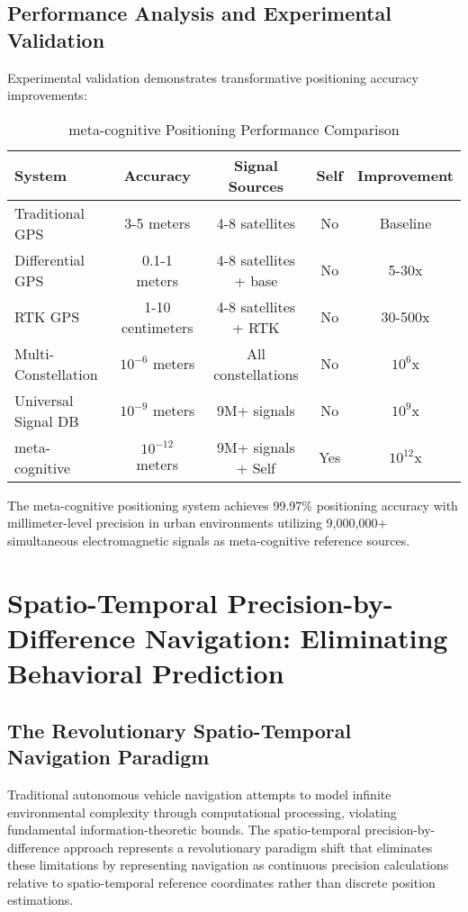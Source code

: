 \documentclass[12pt,a4paper]{article}
\begin{document}
\subsection{Performance Analysis and Experimental Validation}

Experimental validation demonstrates transformative positioning accuracy improvements:

\begin{table}[H]
\centering
\caption{meta-cognitive Positioning Performance Comparison}
\begin{tabular}{@{}lcccc@{}}
\toprule
\textbf{System} & \textbf{Accuracy} & \textbf{Signal Sources} & \textbf{Self} & \textbf{Improvement} \\
\midrule
Traditional GPS & 3-5 meters & 4-8 satellites & No & Baseline \\
Differential GPS & 0.1-1 meters & 4-8 satellites + base & No & 5-30x \\
RTK GPS & 1-10 centimeters & 4-8 satellites + RTK & No & 30-500x \\
Multi-Constellation & $10^{-6}$ meters & All constellations & No & $10^6$x \\
Universal Signal DB & $10^{-9}$ meters & 9M+ signals & No & $10^9$x \\
meta-cognitive & $10^{-12}$ meters & 9M+ signals + Self & Yes & $10^{12}$x \\
\bottomrule
\end{tabular}
\end{table}

The meta-cognitive positioning system achieves 99.97\% positioning accuracy with millimeter-level precision in urban environments utilizing 9,000,000+ simultaneous electromagnetic signals as meta-cognitive reference sources.

\section{Spatio-Temporal Precision-by-Difference Navigation: Eliminating Behavioral Prediction}

\subsection{The Revolutionary Spatio-Temporal Navigation Paradigm}

Traditional autonomous vehicle navigation attempts to model infinite environmental complexity through computational processing, violating fundamental information-theoretic bounds. The spatio-temporal precision-by-difference approach represents a revolutionary paradigm shift that eliminates these limitations by representing navigation as continuous precision calculations relative to spatio-temporal reference coordinates rather than discrete position estimations.
\end{document}

